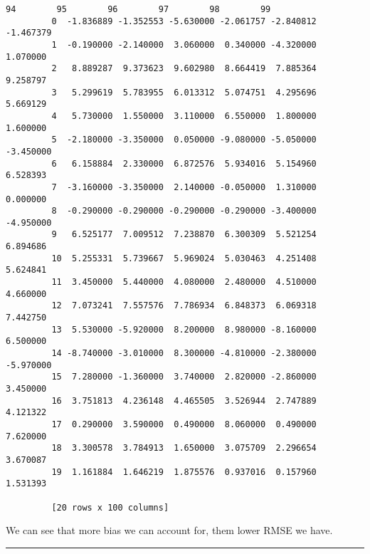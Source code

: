 \documentclass[11pt]{article}
\begin{document}
\begin{Verbatim}[commandchars=\\\{\}]
                   94        95        96        97        98        99  
         0  -1.836889 -1.352553 -5.630000 -2.061757 -2.840812 -1.467379  
         1  -0.190000 -2.140000  3.060000  0.340000 -4.320000  1.070000  
         2   8.889287  9.373623  9.602980  8.664419  7.885364  9.258797  
         3   5.299619  5.783955  6.013312  5.074751  4.295696  5.669129  
         4   5.730000  1.550000  3.110000  6.550000  1.800000  1.600000  
         5  -2.180000 -3.350000  0.050000 -9.080000 -5.050000 -3.450000  
         6   6.158884  2.330000  6.872576  5.934016  5.154960  6.528393  
         7  -3.160000 -3.350000  2.140000 -0.050000  1.310000  0.000000  
         8  -0.290000 -0.290000 -0.290000 -0.290000 -3.400000 -4.950000  
         9   6.525177  7.009512  7.238870  6.300309  5.521254  6.894686  
         10  5.255331  5.739667  5.969024  5.030463  4.251408  5.624841  
         11  3.450000  5.440000  4.080000  2.480000  4.510000  4.660000  
         12  7.073241  7.557576  7.786934  6.848373  6.069318  7.442750  
         13  5.530000 -5.920000  8.200000  8.980000 -8.160000  6.500000  
         14 -8.740000 -3.010000  8.300000 -4.810000 -2.380000 -5.970000  
         15  7.280000 -1.360000  3.740000  2.820000 -2.860000  3.450000  
         16  3.751813  4.236148  4.465505  3.526944  2.747889  4.121322  
         17  0.290000  3.590000  0.490000  8.060000  0.490000  7.620000  
         18  3.300578  3.784913  1.650000  3.075709  2.296654  3.670087  
         19  1.161884  1.646219  1.875576  0.937016  0.157960  1.531393  
         
         [20 rows x 100 columns]
\end{Verbatim}
            
    We can see that more bias we can account for, them lower RMSE we have.

\begin{center}\rule{0.5\linewidth}{\linethickness}\end{center}


    
    
    
    
\end{document}

